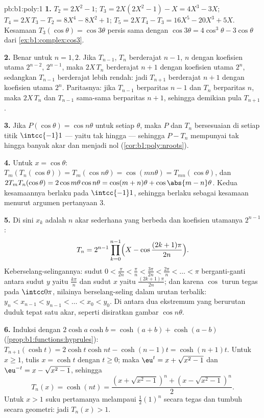 \begin{solution}{pb:b1:poly:1}
\textbf{1.} $T_2 = 2X^2 - 1$; $T_3 = 2X(2X^2 - 1) - X = 4X^3 -
3X$; $T_4 = 2X\,T_3 - T_2 = 8X^4 - 8X^2 + 1$; $T_5 = 2X\,T_4 - T_3
= 16X^5 - 20X^3 + 5X$. Kesamaan $T_3(\cos\theta) = \cos3\theta$
persis sama dengan $\cos3\theta = 4\cos^3\theta - 3\cos\theta$ dari
\cref{ex:b1:complex:cos3}.

\textbf{2.} Benar untuk $n = 1, 2$. Jika $T_{n-1}$, $T_n$ berderajat
$n-1$, $n$ dengan koefisien utama $2^{n-2}$, $2^{n-1}$, maka
$2X\,T_n$ berderajat $n+1$ dengan koefisien utama $2^n$, sedangkan
$T_{n-1}$ berderajat lebih rendah: jadi $T_{n+1}$ berderajat $n + 1$ dengan koefisien
utama $2^n$. Paritasnya: jika $T_{n-1}$ berparitas $n - 1$
dan $T_n$ berparitas $n$, maka $2X\,T_n$ dan $T_{n-1}$ sama-sama berparitas
$n + 1$, sehingga demikian pula $T_{n+1}$.

\textbf{3.} Jika $P(\cos\theta) = \cos n\theta$ untuk setiap $\theta$,
maka $P$ dan $T_n$ bersesuaian di setiap titik $\intcc{-1}1$ --- yaitu
 tak hingga --- sehingga $P - T_n$ mempunyai tak hingga banyak akar dan menjadi
 nol (\cref{cor:b1:poly:nroots}).

\textbf{4.} Untuk $x = \cos\theta$: $T_m(T_n(\cos\theta)) =
T_m(\cos n\theta) = \cos(mn\theta) = T_{mn}(\cos\theta)$, dan
$2T_mT_n(\cos\theta) = 2\cos m\theta\cos n\theta = \cos(m+n)\theta
+ \cos\abs{m - n}\theta$. Kedua kesamaannya berlaku pada $\intcc{-1}1$,
sehingga berlaku sebagai kesamaan  menurut argumen pertanyaan 3.

\textbf{5.} Di sini $x_k$ adalah $n$ akar sederhana yang berbeda dan
koefisien utamanya $2^{n-1}$:
\[
T_n = 2^{n-1}\prod_{k=0}^{n-1}
\Bigl(X - \cos\frac{(2k+1)\pi}{2n}\Bigr) .
\]
Keberselang-selingannya: sudut $0 < \frac{\pi}{2n} < \frac\pi n <
\frac{3\pi}{2n} < \frac{2\pi}n < \dots < \pi$ berganti-ganti antara
sudut $y$ yaitu $\frac{k\pi}n$ dan sudut $x$ yaitu
$\frac{(2k+1)\pi}{2n}$; dan karena $\cos$ turun tegas pada
$\intcc0\pi$, nilainya berselang-seling dalam urutan terbalik: $y_n <
x_{n-1} < y_{n-1} < \dots < x_0 < y_0$. Di antara dua ekstremum
yang berurutan duduk tepat satu akar, seperti disiratkan gambar $\cos n\theta$.

\textbf{6.} Induksi dengan $2\cosh a\cosh b = \cosh(a + b) +
\cosh(a - b)$ (\cref{prop:b1:functions:hyprules}): $T_{n+1}(\cosh
t) = 2\cosh t\cosh nt - \cosh(n-1)t = \cosh(n+1)t$. Untuk $x \geq
1$, tulis $x = \cosh t$ dengan $t \geq 0$; maka $\eu^t = x +
\sqrt{x^2 - 1}$ dan $\eu^{-t} = x - \sqrt{x^2 - 1}$, sehingga
\[
T_n(x) = \cosh(nt)
= \frac{(x + \sqrt{x^2-1})^n + (x - \sqrt{x^2-1})^n}2 .
\]
Untuk $x > 1$ suku pertamanya melampaui $\frac12(1)^n$ secara tegas dan
tumbuh secara geometri: jadi $T_n(x) > 1$.


\end{solution}
